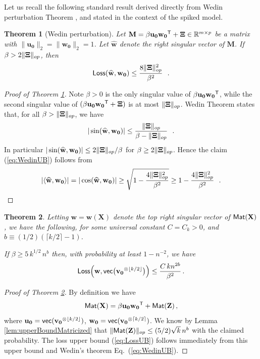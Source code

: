 \documentclass[11pt]{article}
\newtheorem{theorem}{Theorem}
\theoremstyle{definition}
\def\Loss{{\sf Loss}}
\def\<{\langle}
\def\>{\rangle}
\def\bM{{\bf M}}
\def\bE{{\bf \Xi}}
\def\reals{\mathbb{R}}
\def\sT{{\sf T}}
\def\bw{\mathbf{w}}
\def\hbw{\widehat{\mathbf{w}}}
\def\bvz{\mathbf{v_0}}
\def\bwz{\mathbf{w_0}}
\def\buz{\mathbf{u_0}}
\def\bX{\mathbf{X}}
\def\bM{\mathbf{M}}
\def\vec{{\sf{vec}}}
\def\bZ{\mathbf{Z}}
\def\M{{\sf Mat}}
\def\trans{^\sT}
\begin{document}
Let us recall the following standard result derived directly from
Wedin perturbation Theorem \cite{wedin72}, and stated in the context
of the spiked 
model.
%
\begin{theorem}[Wedin perturbation]\label{th:wedin}
Let $\bM = \beta \buz \bwz\trans + \bE \in \reals^{m \times p}$ be a
matrix with $\|\buz\|_2 = \|\bwz\|_2 = 1$. Let $\hbw$ denote the right
singular vector of $\bM$. If $\beta> 2 \|\bE\|_{op}$, then 
\begin{equation}
\Loss(\hbw,\bwz) \leq  \frac{8\|\bE\|_{op}^2}{\beta^2}~~. \label{eq:WedinUB}
\end{equation}
%
%
\end{theorem}
%
\begin{proof}[Proof of Theorem \ref{th:wedin}]
Note $\beta>0$ is the only singular value of $ \beta \buz \bwz\trans
$,  while the second singular value of $(\beta \buz \bwz\trans + \bE)$
is at most $\|\bE\|_{op}$.
Wedin Theorem states that,
for all $\beta>\|\bE\|_{op}$, we have
%
\begin{align}
%
 |\sin (\hbw,\bwz)| \leq \frac{\|\bE\|_{op}}{\beta-\|\bE\|_{op}}~~.
%
\end{align}
%
In particular  $|\sin (\hbw,\bwz)|\le 2\|\bE\|_{op}/\beta$ for
$\beta\ge 2\|\bE\|_{op}$. Hence the claim  (\ref{eq:WedinUB}) follows from
%
\begin{align}
%
|\<\hbw,\bwz\>| = 
|\cos (\hbw,\bwz)| \geq \sqrt{1-
  \frac{4\|\bE\|_{op}^2}{\beta^2}} \geq 1- 
\frac{4\|\bE\|_{op}^2}{\beta^2}~~.
%
\end{align}
%
\end{proof}
%
\begin{theorem}\label{th:unfold}
Letting $\bw=\bw(\bX)$  denote the top right singular vector of
$\M(\bX)$, we have the following, for some universal constant $C=C_k>0$,
and $b \equiv (1/2)(\lceil k/2\rceil -1)$. 

If $\beta\ge 5\, k^{1/2}\, n^{b}$ then,
with probability at least $1-n^{-2}$, we have
%
\begin{align}
%
\Loss\Big(\bw,\vec \big( \bvz^{\otimes \lfloor k/2\rfloor }
\big)\Big)\le \frac{  C \, k n^{2b}}{\beta^2}\, . \label{eq:LossUB}
%
\end{align}
%
%
\end{theorem}
%
\begin{proof}[Proof of Theorem \ref{th:unfold}]
By definition we have
%
\begin{align}
%
\M(\bX) = \beta\buz\bwz\trans + \M(\bZ)\, ,
%
\end{align}
%
where $\buz = \vec ( \bvz^{\otimes \lfloor k/2\rfloor })$, $\bwz = \vec ( \bvz^{\otimes \lceil k/2\rceil })$.
We know by Lemma \ref{lem:upperBoundMatricized} that $
\|\M(\bZ)\|_{op} \leq (5/2)\sqrt{k} \, n^b$  with the claimed probability. The
loss  upper bound (\ref{eq:LossUB}) follows immediately from this
upper bound and Wedin's theorem Eq.~(\ref{eq:WedinUB}).
\end{proof}
%
\end{document}
